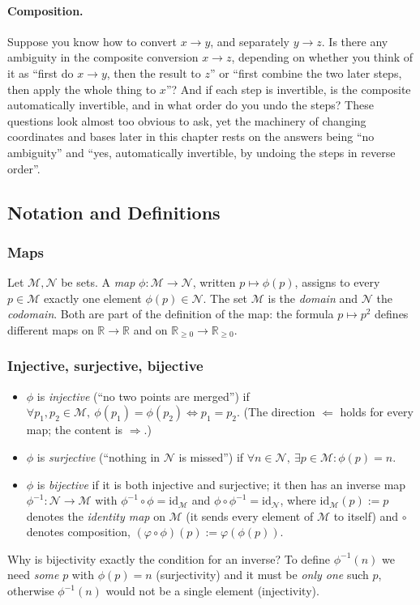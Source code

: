 \documentclass[11pt]{article}
\begin{document}
\paragraph{Composition.}
Suppose you know how to convert $x\to y$, and separately $y\to z$. Is there any ambiguity in the composite conversion $x\to z$, depending on whether you think of it as ``first do $x\to y$, then the result to $z$'' or ``first combine the two later steps, then apply the whole thing to $x$''? And if each step is invertible, is the composite automatically invertible, and in what order do you undo the steps? These questions look almost too obvious to ask, yet the machinery of changing coordinates and bases later in this chapter rests on the answers being ``no ambiguity'' and ``yes, automatically invertible, by undoing the steps in reverse order''.

\subsection*{Notation and Definitions}

\subsubsection*{Maps}
Let $\mathcal M,\mathcal N$ be sets. A \emph{map} $\phi:\mathcal M\to\mathcal N$, written $p\mapsto\phi(p)$, assigns to every $p\in\mathcal M$ exactly one element $\phi(p)\in\mathcal N$. The set $\mathcal M$ is the \emph{domain} and $\mathcal N$ the \emph{codomain}. Both are part of the definition of the map: the formula $p\mapsto p^2$ defines different maps on $\mathbb R\to\mathbb R$ and on $\mathbb R_{\ge0}\to\mathbb R_{\ge0}$.

\subsubsection*{Injective, surjective, bijective}
\begin{itemize}
  \item $\phi$ is \emph{injective} (``no two points are merged'') if $\forall p_1,p_2\in\mathcal M,\ \phi(p_1)=\phi(p_2)\iff p_1=p_2$. (The direction $\Leftarrow$ holds for every map; the content is $\Rightarrow$.)
  \item $\phi$ is \emph{surjective} (``nothing in $\mathcal N$ is missed'') if $\forall n\in\mathcal N,\ \exists p\in\mathcal M:\phi(p)=n$.
  \item $\phi$ is \emph{bijective} if it is both injective and surjective; it then has an inverse map $\phi^{-1}:\mathcal N\to\mathcal M$ with $\phi^{-1}\circ\phi=\mathrm{id}_{\mathcal M}$ and $\phi\circ\phi^{-1}=\mathrm{id}_{\mathcal N}$, where $\mathrm{id}_{\mathcal M}(p):=p$ denotes the \emph{identity map} on $\mathcal M$ (it sends every element of $\mathcal M$ to itself) and $\circ$ denotes composition, $(\varphi\circ\phi)(p):=\varphi(\phi(p))$.
\end{itemize}
Why is bijectivity exactly the condition for an inverse? To define $\phi^{-1}(n)$ we need \emph{some} $p$ with $\phi(p)=n$ (surjectivity) and it must be \emph{only one} such $p$, otherwise $\phi^{-1}(n)$ would not be a single element (injectivity).
\end{document}
